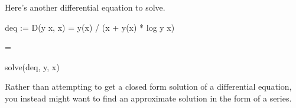 {{{{{{{{\begin{xtc}
\begin{xtccomment}
Here's another differential equation to solve.
\end{xtccomment}
\begin{spadsrc}
deq := D(y x, x) = y(x) / (x + y(x) * log y x) 
\end{spadsrc}
\begin{TeXOutput}
\begin{fricasmath}{8}
=%
\end{fricasmath}
\end{TeXOutput}
\end{xtc}
\begin{xtc}
\begin{xtccomment}
\end{xtccomment}
\begin{spadsrc}
solve(deq, y, x) 
\end{spadsrc}
\begin{TeXOutput}
\begin{fricasmath}{9}
%
\end{fricasmath}
\end{TeXOutput}
\end{xtc}

Rather than attempting to get a closed form solution of
a differential equation, you instead might want to find an
approximate solution in the form of a series.

}}}}}}}}
